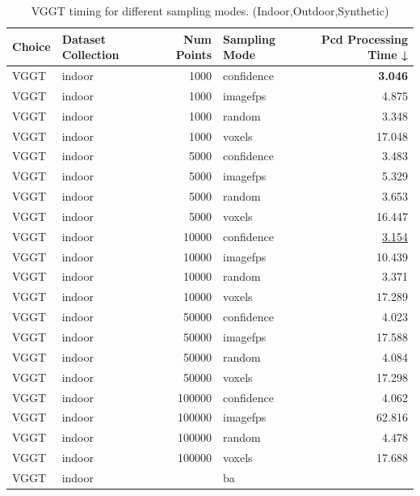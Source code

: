 \begin{table}[H]
\caption{\ifdefined\customcaption \customcaption \else VGGT timing for different sampling modes. (Indoor,Outdoor,Synthetic) \fi}
\label{tab:01_sampling_mode_timing_indoor,outdoor,synthetic}
\centering
\scriptsize
\begin{tabular}{llrlr}
\toprule
Choice & Dataset Collection & Num Points & Sampling Mode & Pcd Processing Time ↓ \\
\midrule
VGGT & indoor & 1000 & confidence & \textbf{3.046} \\
VGGT & indoor & 1000 & imagefps & 4.875 \\
VGGT & indoor & 1000 & random & 3.348 \\
VGGT & indoor & 1000 & voxels & 17.048 \\
VGGT & indoor & 5000 & confidence & 3.483 \\
VGGT & indoor & 5000 & imagefps & 5.329 \\
VGGT & indoor & 5000 & random & 3.653 \\
VGGT & indoor & 5000 & voxels & 16.447 \\
VGGT & indoor & 10000 & confidence & \underline{3.154} \\
VGGT & indoor & 10000 & imagefps & 10.439 \\
VGGT & indoor & 10000 & random & 3.371 \\
VGGT & indoor & 10000 & voxels & 17.289 \\
VGGT & indoor & 50000 & confidence & 4.023 \\
VGGT & indoor & 50000 & imagefps & 17.588 \\
VGGT & indoor & 50000 & random & 4.084 \\
VGGT & indoor & 50000 & voxels & 17.298 \\
VGGT & indoor & 100000 & confidence & 4.062 \\
VGGT & indoor & 100000 & imagefps & 62.816 \\
VGGT & indoor & 100000 & random & 4.478 \\
VGGT & indoor & 100000 & voxels & 17.688 \\
VGGT & indoor &  & ba &  \\
\bottomrule
\end{tabular}
\end{table}